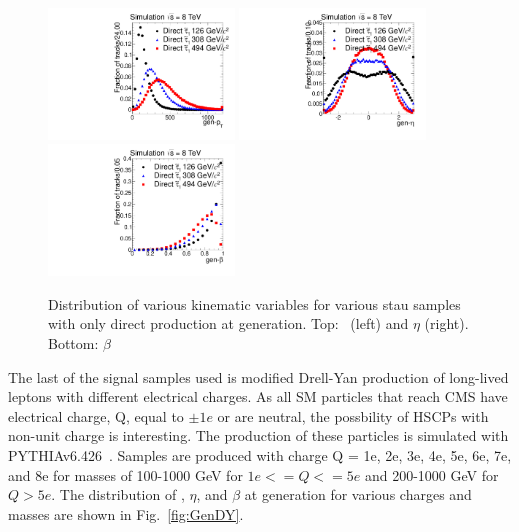 \begin{figure}
 \begin{center}
  \includegraphics[clip=true, trim=0.0cm 0cm 1.4cm 0cm, width=0.44\textwidth]{figures/muonly/Selection_Comp_PPStau_genpT}
  \includegraphics[clip=true, trim=0.0cm 0cm 1.4cm 0cm, width=0.44\textwidth]{figures/muonly/Selection_Comp_PPStau_geneta}
  \includegraphics[clip=true, trim=0.0cm 0cm 1.4cm 0cm, width=0.44\textwidth]{figures/muonly/Selection_Comp_PPStau_genbeta}
 \end{center}
 \caption[Distribution of \pt, $\eta$, and $\beta$ for various Pair Prod. stau samples at generation]
{Distribution of various kinematic variables for various stau samples with only direct production at generation.
Top: \pt\ (left) and $\eta$ (right).
Bottom: $\beta$
   \label{fig:GenPPStau}}
\end{figure}

The last of the signal samples used is modified Drell-Yan production of long-lived leptons with different electrical charges.
As all SM particles that reach CMS have electrical charge, Q, equal to $\pm1e$ or
are neutral, the possbility of HSCPs with non-unit charge is interesting. 
The production of these particles is simulated with PYTHIAv6.426~\cite{Sjostrand:2006za}. 
Samples are produced with charge Q = 1e, 2e, 3e, 4e, 5e, 6e, 7e, and 8e for masses of 
100-1000 GeV for $1e <= Q <= 5e$ and 200-1000 GeV for $Q > 5e$.
The distribution of \pt, $\eta$, and $\beta$ at generation for various charges and masses are shown in Fig.~\ref{fig:GenDY}.

